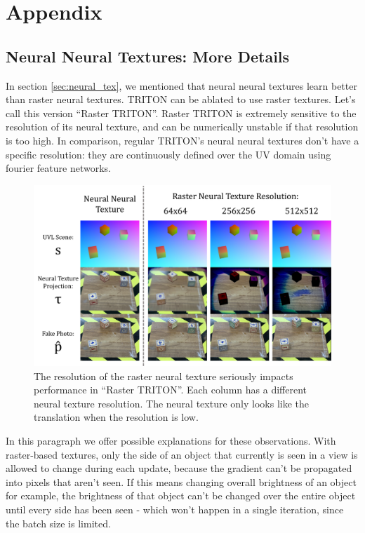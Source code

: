 \section{Appendix} 

\subsection{Neural Neural Textures: More Details}

	In section \ref{sec:neural_tex}, we mentioned that neural neural textures learn better than raster neural textures. 
	TRITON can be ablated to use raster textures. Let's call this version ``Raster TRITON''. 
	Raster TRITON is extremely sensitive to the resolution of its neural texture, and can be numerically unstable if that resolution is too high.
	In comparison, regular TRITON's neural neural textures don't have a specific resolution: they are continuously defined over the UV domain using fourier feature networks.

	\begin{figure}[H]
		\begin{center}
			\includegraphics[width=400pt]{../images/raster_texture_resolution_comparisons.pdf}
		\end{center}
		\caption{
			The resolution of the raster neural texture seriously impacts performance in ``Raster TRITON''. Each column has a different neural texture resolution.
			The neural texture only looks like the translation when the resolution is low.
		}
		\label{fig:raster_texture_resolution_comparisons}
	\end{figure}

	In this paragraph we offer possible explanations for these observations.
	With raster-based textures, only the side of an object that currently is seen in a view is allowed to change during each update, because the gradient can't be propagated into pixels that aren't seen.
	If this means changing overall brightness of an object for example, the brightness of that object can't be changed over the entire object until every side has been seen - which won't happen in a single iteration, since the batch size is limited.

